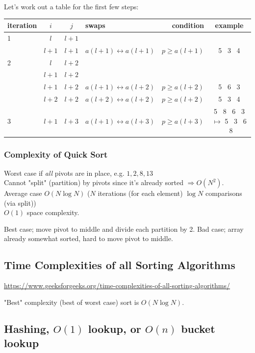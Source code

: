 \documentclass[10pt]{amsart}
\begin{document}
Let's work out a table for the first few steps:
\begin{center}
	\begin{tabular}{ l | c | c | l | r | c }
		\hline
		iteration & $i$ & $j$ & swaps & condition & example \\ \hline
		1 & $l$ & $l+1$ & & & \\ \hline
		 & $l + 1$ &  $l + 1$ & $a(l + 1) \leftrightarrow a(l+1)$ & $p\geq a(l+1)$ & 5 \, 3 \, 4 \\
		 2 & $l$ & $l+2$ & & & \\
		 & $l+1$ & $l+2$ & & & \\
		 & $l + 1$ & $l+2$ & $a(l+1) \leftrightarrow a(l+2)$ & $p \geq a(l+2)$ & 5 \, 6 \, 3 \\
		 & $l + 2$ & $l+ 2$ & $a(l+2) \leftrightarrow a(l+2)$ & $p \geq a(l+2)$ & 5 \, 3 \, 4 \\
		 3 & $l+1$ & $l+3$ & $a(l+1) \leftrightarrow a(l+3)$ & $p\geq a(l+3)$ & 5 \, 8 \, 6 \, 3 $\mapsto $ 5 \, 3 \, 6 \, 8 \\
		\hline
	\end{tabular}
\end{center}

\subsubsection{Complexity of Quick Sort}

Worst case if \emph{all} pivots are in place, e.g. $1,2,8,13$ \\
Cannot "split" (partition) by pivots since it's already sorted $\Longrightarrow O(N^2)$. \\
Average case $O(N\log{N})$ ($N$ iterations (for each element) $\log{N}$ comparisons (via split)) \\
$O(1)$ space complexity.

Best case; move pivot to middle and divide each partition by 2.
Bad case; array already somewhat sorted, hard to move pivot to middle.

\subsection{Time Complexities of all Sorting Algorithms}

\url{https://www.geeksforgeeks.org/time-complexities-of-all-sorting-algorithms/}

"Best" complexity (best of worst case) sort is $O(N \log{N})$.


\subsection{Hashing, $O(1)$ lookup, or $O(n)$ bucket lookup}
\end{document}
